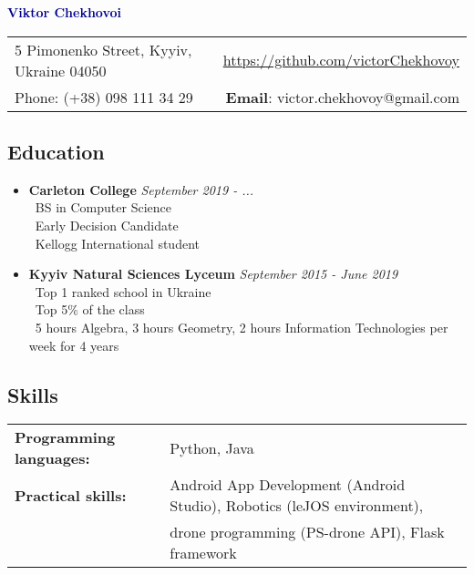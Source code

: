 \documentclass[letter,10pt]{extarticle}
\begin{document}
\begin{center}
\LARGE{\textcolor{darkblue}{\textbf{Viktor Chekhovoi}}}\\
\end{center}
\begin{tabular*}{\textwidth}{@{\extracolsep{\fill}}lr}
5 Pimonenko Street, Kyyiv, Ukraine 04050 &
{\url{https://github.com/victorChekhovoy}} \\
{Phone}: (+38) 098 111 34 29 & {\textbf{Email}: victor.chekhovoy@gmail.com}
\end{tabular*}
\noindent\makebox[\linewidth]{\rule{\textwidth}{0.4pt}}
\vspace{-1em}
\subsection*{Education}
\vspace{-0.5em}
\begin{itemize}
\item[]{\textbf{\large{Carleton College}}
  \hfill \emph{September 2019 - ...}
 \vspace{0.1 em}  \\
  \textendash\ BS in Computer Science  \\
  \textendash\ Early Decision Candidate \\
  \textendash\ Kellogg International student}
\vspace{-0.5em}
\item[]{\textbf{\large{Kyyiv Natural Sciences Lyceum}} 
  \hfill \emph{September 2015 - June 2019} 
  \vspace{0.1 em}\\
  \textendash\ Top 1 ranked school in Ukraine \\
  \textendash\ Top 5\% of the class \\
  \textendash\ 5 hours Algebra, 3 hours Geometry, 2 hours Information Technologies per week for 4 years}
\end{itemize}
\vspace{-2em}
\subsection*{Skills}
\vspace{-0.5em}
\begin{tabular}{l l}
\textbf{Programming languages:} & Python, Java\\
\textbf{Practical skills:} &  Android App Development (Android Studio), Robotics (leJOS environment),\\& drone programming (PS-drone API), Flask framework \\
\end{tabular}
\vspace{-1.2em}
\end{document}
